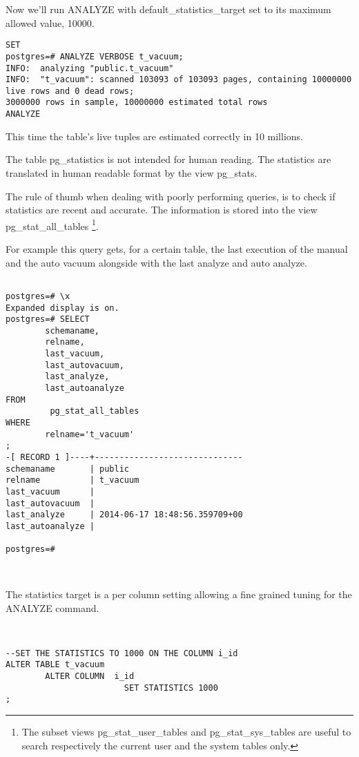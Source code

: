 Now we'll run ANALYZE with default\_statistics\_target set to its maximum allowed value, 10000.


\begin{lstlisting}[style=pgsql]
SET
postgres=# ANALYZE VERBOSE t_vacuum;
INFO:  analyzing "public.t_vacuum"
INFO:  "t_vacuum": scanned 103093 of 103093 pages, containing 10000000 live rows and 0 dead rows; 
3000000 rows in sample, 10000000 estimated total rows
ANALYZE
\end{lstlisting}

This time the table's live tuples are estimated correctly in 10 millions.\newline

The table pg\_statistics is not intended for human reading. The statistics are translated in human 
readable format by the view pg\_stats.\newline

The rule of thumb when dealing with poorly performing queries, is to check if statistics are recent 
and accurate. The information is stored into the view pg\_stat\_all\_tables \footnote{The subset views 
pg\_stat\_user\_tables and pg\_stat\_sys\_tables are useful to search respectively the current user and the 
system tables only.}.

For example this query gets, for a certain table,  the last execution of the manual and the auto vacuum 
alongside with the last analyze and auto analyze.

\begin{lstlisting}[style=pgsql]

postgres=# \x
Expanded display is on.
postgres=# SELECT
        schemaname,
        relname,
        last_vacuum,
        last_autovacuum,
        last_analyze,
        last_autoanalyze
FROM
         pg_stat_all_tables
WHERE
        relname='t_vacuum'
;
-[ RECORD 1 ]----+------------------------------
schemaname       | public
relname          | t_vacuum
last_vacuum      | 
last_autovacuum  | 
last_analyze     | 2014-06-17 18:48:56.359709+00
last_autoanalyze | 

postgres=# 



\end{lstlisting}


The statistics target is a per column setting allowing a fine grained tuning for the ANALYZE command.

\begin{lstlisting}[style=pgsql]


--SET THE STATISTICS TO 1000 ON THE COLUMN i_id
ALTER TABLE t_vacuum 
        ALTER COLUMN  i_id 
                        SET STATISTICS 1000
;

\end{lstlisting}

